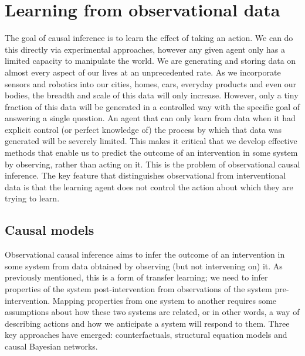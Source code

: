 \documentclass[11pt,a4paper,twoside]{report}
\theoremstyle{plain}
\theoremstyle{definition}
\begin{document}
\chapter{Learning from observational data}
\label{chap:causality}

The goal of causal inference is to learn the effect of taking an action. We can do this directly via experimental approaches, however any given agent only has a limited capacity to manipulate the world. We are generating and storing data on almost every aspect of our lives at an unprecedented rate. As we incorporate sensors and robotics into our cities, homes, cars, everyday products and even our bodies, the breadth and scale of this data will only increase. However, only a tiny fraction of this data will be generated in a controlled way with the specific goal of answering a single question. An agent that can only learn from data when it had explicit control (or perfect knowledge of) the process by which that data was generated will be severely limited. This makes it critical that we develop effective methods that enable us to predict the outcome of an intervention in some system by observing, rather than acting on it. This is the problem of observational causal inference. The key feature that distinguishes observational from interventional data is that the learning agent does not control the action about which they are trying to learn.

\section{Causal models}
\label{sec:causal_models}

Observational causal inference aims to infer the outcome of an intervention in some system from data obtained by observing (but not intervening on) it. As previously mentioned, this is a form of transfer learning; we need to infer properties of the system post-intervention from observations of the system pre-intervention. Mapping properties from one system to another requires some assumptions about how these two systems are related, or in other words, a way of describing actions and how we anticipate a system will respond to them. Three key approaches have emerged: counterfactuals, structural equation models and causal Bayesian networks. 
\end{document}
